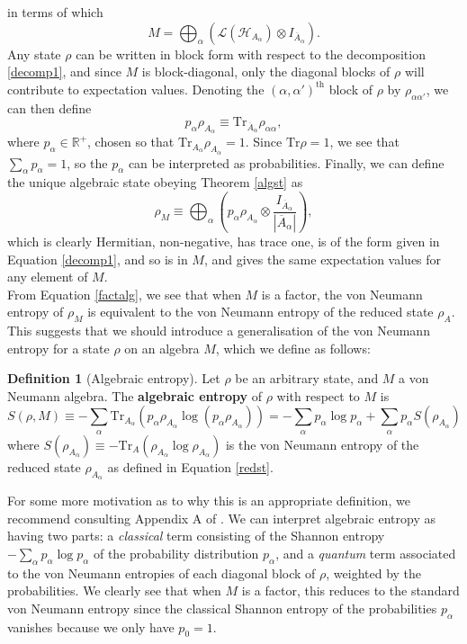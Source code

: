 \documentclass[12pt,a4paper]{report}
\numberwithin{equation}{section}
\newcommand{\ol}[1]{\overline{#1}}
\newcommand{\tr}{\text{Tr}}
\theoremstyle{definition}
\newtheorem{definition}{Definition}[section]
\theoremstyle{theorem}
\theoremstyle{theorem}
\theoremstyle{example}
\theoremstyle{definition}
\begin{document}
in terms of which 
\begin{equation}
	M=\bigoplus_{\alpha}(\mathcal{L}(\mathcal{H}_{A_{\alpha}})\otimes I_{\ol{A}_{\alpha}}).
\end{equation}
Any state $\rho$ can be written in block form with respect to the decomposition \ref{decomp1}, and since $M$ is block-diagonal, only the diagonal blocks of $\rho$ will contribute to expectation values. Denoting the $(\alpha,\alpha')^{\text{th}}$ block of $\rho$ by $\rho_{\alpha\alpha'}$, we can then define
\begin{equation}\label{redst}
	p_{\alpha}\rho_{A_{\alpha}}\equiv\tr_{\ol{A}_{\alpha}}\rho_{\alpha\alpha},
\end{equation}
where $p_{\alpha}\in\mathbb{R}^{+}$, chosen so that $\tr_{A_{\alpha}}\rho_{A_{\alpha}}=1$. Since $\tr\rho=1$, we see that $\sum_{\alpha}p_{\alpha}=1$, so the $p_{\alpha}$ can be interpreted as probabilities. Finally, we can define the unique algebraic state obeying Theorem \ref{algst} as
\begin{equation}
	\rho_{M}\equiv\bigoplus_{\alpha}\left(p_{\alpha}\rho_{A_{\alpha}}\otimes\frac{I_{\ol{A}_{\alpha}}}{|\ol{A}_{\alpha}|}\right),
\end{equation}
which is clearly Hermitian, non-negative, has trace one, is of the form given in Equation \ref{decomp1}, and so is in $M$, and gives the same expectation values for any element of $M$.\\
From Equation \ref{factalg}, we see that when $M$ is a factor, the von Neumann entropy of $\rho_{M}$ is equivalent to the von Neumann entropy of the reduced state $\rho_{A}$. This suggests that we should introduce a generalisation of the von Neumann entropy for a state $\rho$ on an algebra $M$, which we define as follows:
\begin{definition}[Algebraic entropy]
	Let $\rho$ be an arbitrary state, and $M$ a von Neumann algebra. The \textbf{algebraic entropy} of $\rho$ with respect to $M$ is
	\begin{equation}
		S(\rho,M)\equiv-\sum_{\alpha}\tr_{A_{\alpha}}(p_{\alpha}\rho_{A_{\alpha}}\log(p_{\alpha}\rho_{A_{\alpha}}))=-\sum_{\alpha}p_{\alpha}\log p_{\alpha}+\sum_{\alpha}p_{\alpha}S(\rho_{A_{\alpha}})
	\end{equation}
	where $S(\rho_{A_{\alpha}})\equiv-\tr_{A}(\rho_{A_{\alpha}}\log\rho_{A_{\alpha}})$ is the von Neumann entropy of the reduced state $\rho_{A_{\alpha}}$ as defined in Equation \ref{redst}.
\end{definition}
For some more motivation as to why this is an appropriate definition, we recommend consulting Appendix A of \cite{Harlow}. We can interpret algebraic entropy as having two parts: a \textit{classical} term consisting of the Shannon entropy $-\sum_{\alpha}p_{\alpha}\log{p_{\alpha}}$ of the probability distribution $p_{\alpha}$, and a \textit{quantum} term associated to the von Neumann entropies of each diagonal block of $\rho$, weighted by the probabilities. We clearly see that when $M$ is a factor, this reduces to the standard von Neumann entropy since the classical Shannon entropy of the probabilities $p_{\alpha}$ vanishes because we only have $p_{0}=1$.\\
\end{document}
